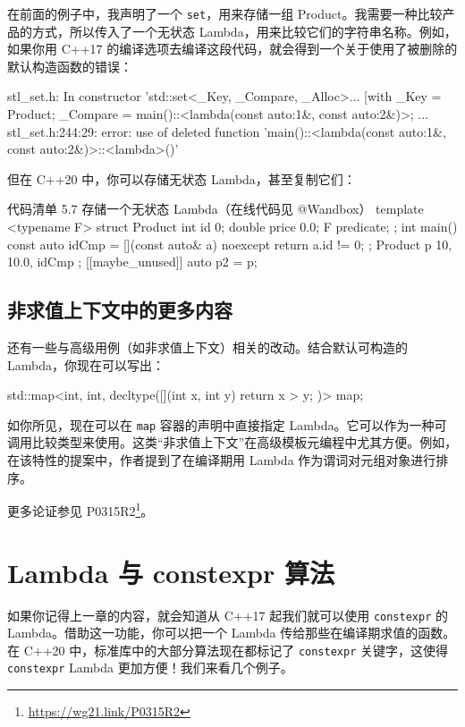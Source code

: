 在前面的例子中，我声明了一个 \texttt{set}，用来存储一组 Product。我需要一种比较产品的方式，所以传入了一个无状态 Lambda，用来比较它们的字符串名称。例如，如果你用 C++17 的编译选项去编译这段代码，就会得到一个关于使用了被删除的默认构造函数的错误：

\begin{codebox}
stl_set.h: In constructor
'std::set<_Key, _Compare, _Alloc>...
[with _Key = Product;
_Compare = main()::<lambda(const auto:1&, const auto:2&)>;
...
stl_set.h:244:29: error: use of deleted function
'main()::<lambda(const auto:1&, const auto:2&)>::<lambda>()'
\end{codebox}

但在 C++20 中，你可以存储无状态 Lambda，甚至复制它们：

\begin{codeboxt}{代码清单 5.7 存储一个无状态 Lambda（在线代码见 @Wandbox）}
template <typename F>
struct Product {
int id {0};
double price { 0.0};
F predicate;
};
int main() {
const auto idCmp = [](const auto& a) noexcept {
return a.id != 0;
};
Product p { 10, 10.0, idCmp };
[[maybe_unused]] auto p2 = p;
}
\end{codeboxt}

\subsection{非求值上下文中的更多内容}

还有一些与高级用例（如非求值上下文）相关的改动。结合默认可构造的 Lambda，你现在可以写出：

\begin{codebox}
std::map<int, int, decltype([](int x, int y) { return x > y; })> map;
\end{codebox}

如你所见，现在可以在 \texttt{map} 容器的声明中直接指定 Lambda。它可以作为一种可调用比较类型来使用。这类“非求值上下文”在高级模板元编程中尤其方便。例如，在该特性的提案中，作者提到了在编译期用 Lambda 作为谓词对元组对象进行排序。

更多论证参见 P0315R2\footnote{\url{https://wg21.link/P0315R2}}。

\section{Lambda 与 constexpr 算法}

如果你记得上一章的内容，就会知道从 C++17 起我们就可以使用 \texttt{constexpr} 的 Lambda。借助这一功能，你可以把一个 Lambda 传给那些在编译期求值的函数。在 C++20 中，标准库中的大部分算法现在都标记了 \texttt{constexpr} 关键字，这使得 \texttt{constexpr} Lambda 更加方便！我们来看几个例子。


